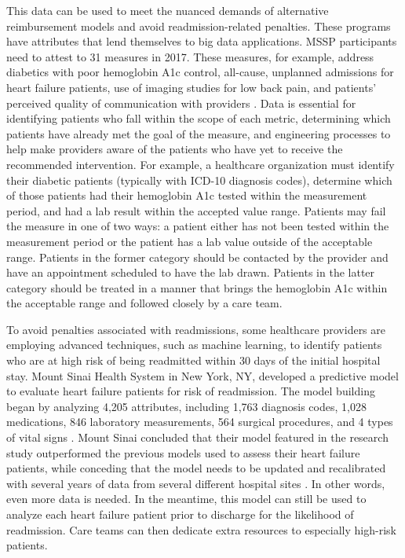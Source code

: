 \documentclass[sigconf]{acmart}
\begin{document}
 This data can be used to meet the nuanced demands of alternative reimbursement models and avoid readmission-related penalties. These programs have attributes that lend themselves to big data applications. MSSP participants need to attest to 31 measures in 2017. These measures, for example, address diabetics with poor hemoglobin A1c control, all-cause, unplanned admissions for heart failure patients, use of imaging studies for low back pain, and patients' perceived quality of communication with providers \cite{editor07}. Data is essential for identifying patients who fall within the scope of each metric, determining which patients have already met the goal of the measure, and engineering processes to help make providers aware of the patients who have yet to receive the recommended intervention. For example, a healthcare organization must identify their diabetic patients (typically with ICD-10 diagnosis codes), determine which of those patients had their hemoglobin A1c tested within the measurement period, and had a lab result within the accepted value range. Patients may fail the measure in one of two ways: a patient either has not been tested within the measurement period or the patient has a lab value outside of the acceptable range. Patients in the former category should be contacted by the provider and have an appointment scheduled to have the lab drawn. Patients in the latter category should be treated in a manner that brings the hemoglobin A1c within the acceptable range and followed closely by a care team.

 To avoid penalties associated with readmissions, some healthcare providers are employing advanced techniques, such as machine learning, to identify patients who are at high risk of being readmitted within 30 days of the initial hospital stay. Mount Sinai Health System in New York, NY, developed a predictive model to evaluate heart failure patients for risk of readmission. The model building began by analyzing 4,205 attributes, including 1,763 diagnosis codes, 1,028 medications, 846 laboratory measurements, 564 surgical procedures, and 4 types of vital signs \cite{editor08}. Mount Sinai concluded that their model featured in the research study outperformed the previous models used to assess their heart failure patients, while conceding that the model needs to be updated and recalibrated with several years of data from several different hospital sites \cite{editor08}. In other words, even more data is needed. In the meantime, this model can still be used to analyze each heart failure patient prior to discharge for the likelihood of readmission. Care teams can then dedicate extra resources to especially high-risk patients.
\end{document}
